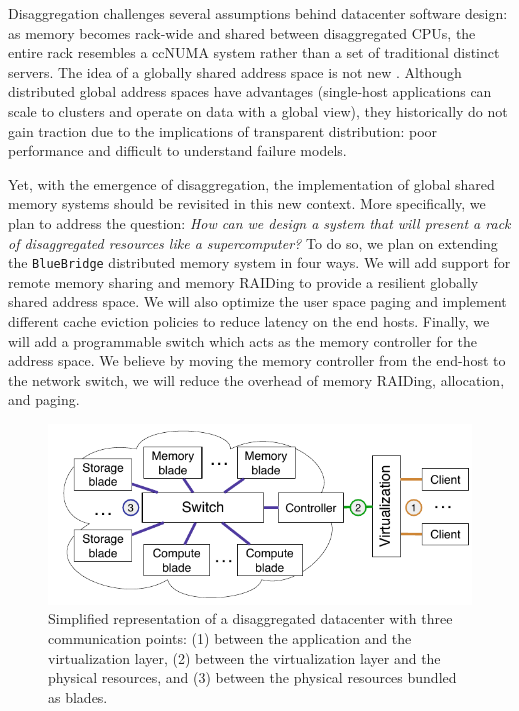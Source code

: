 Disaggregation challenges several assumptions behind datacenter software
design: as memory becomes rack-wide and shared between disaggregated CPUs, the
entire rack resembles a ccNUMA system rather than a set of traditional
distinct servers. 
The idea of a globally shared address space is not new .
Although distributed global address spaces have advantages (single-host
applications can scale to clusters and operate on data with a global view),
they historically do not gain traction due to the implications of transparent
distribution: poor performance and difficult to understand failure models. 


Yet, with the emergence of disaggregation, the implementation of global shared
memory systems should be revisited in this new context. More specifically, we
plan to address the question: \emph{How can we design a system that will
present a rack of disaggregated resources like a supercomputer?} To do so, we
plan on extending the \texttt{BlueBridge} distributed memory system in four
ways. We will add support for remote memory sharing and memory RAIDing to
provide a resilient globally shared address space. We will also optimize the
user space paging and implement different cache eviction policies to reduce
latency on the end hosts. Finally, we will add a programmable switch which acts
as the memory controller for the address space. We believe by moving the memory
controller from the end-host to the network switch, we will reduce the overhead
of memory RAIDing, allocation, and paging.


\begin{figure}
    \centering
    \includegraphics[width=\columnwidth]{fig/ddc-overview}
    \caption{Simplified representation of a disaggregated datacenter with
    three communication points: (1) between the application and the
    virtualization layer,
    (2) between the virtualization layer and the physical resources, and (3)
    between the physical resources bundled as blades.}
    \label{fig:DDC}
\end{figure}
